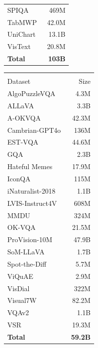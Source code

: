 \begin{table}[!h]
\begin{minipage}[t]{0.245\textwidth}
\begin{tabular}{lr}
SPIQA~\cite{pramanick2024spiqa} & 469M \\
TabMWP~\cite{lu2023tabmwp} & 42.0M \\
UniChart~\cite{masry2023unichart} & 13.1B \\
VisText~\cite{tang2023vistext} & 20.8M \\
\midrule
\textbf{Total} & \textbf{103B} \\
\bottomrule
\end{tabular}
\end{minipage}
\hfill
\begin{minipage}[t]{0.245\textwidth}
\centering
\begin{tabular}{lr}
\toprule
\rowcolor{instructcolor}\multicolumn{2}{l}{\textit{General QA}} \\
Dataset & Size \\
\midrule
AlgoPuzzleVQA~\cite{ghosal2024algopuzzlevqa} & 4.3M \\
ALLaVA~\cite{chen2024allava} & 3.3B \\
A-OKVQA~\cite{schwenk2022aokvqa} & 42.3M \\
Cambrian-GPT4o~\cite{tong2024cambrian} & 136M \\
EST-VQA~\cite{wang2020estvqa} & 44.6M \\
GQA~\cite{hudson2019gqa} & 2.3B \\
Hateful Memes~\cite{kiela2020hateful} & 17.9M \\
IconQA~\cite{lu2021iconqa} & 115M \\
iNaturalist-2018~\cite{vanhorn2018inaturalist} & 1.1B \\
LVIS-Instruct4V~\cite{wang2023lvisinstruct4v} & 608M \\
MMDU~\cite{liu2024mmdu} & 324M \\
OK-VQA~\cite{marino2019okvqa} & 21.5M \\
ProVision-10M~\cite{zhang2024provision} & 47.9B \\
SoM-LLaVA~\cite{yan2024listitems} & 1.7B \\
Spot-the-Diff~\cite{jhamtani2018spotthediff} & 5.7M \\
ViQuAE~\cite{lerner2022viquae} & 2.9M \\
VisDial~\cite{das2017visdial} & 322M \\
Visual7W~\cite{zhu2016visual7w} & 82.2M \\
VQAv2~\cite{goyal2017making} & 1.1B \\
VSR~\cite{liu2023vsr} & 19.3M \\
\midrule
\textbf{Total} & \textbf{59.2B} \\

\end{tabular}
\end{minipage}
\end{table}
